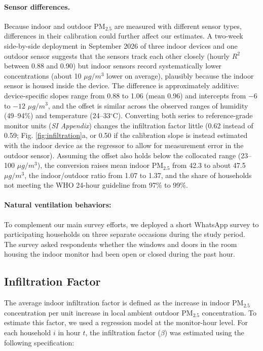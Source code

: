\documentclass[9pt,twocolumn,twoside]{pnas-new}
\begin{document}
\paragraph{Sensor differences.}
Because indoor and outdoor PM$_{2.5}$ are measured with different sensor types, differences in their calibration could further affect our estimates. A two-week side-by-side deployment in September 2026 of three indoor devices and one outdoor sensor suggests that the sensors track each other closely (hourly $R^2$ between 0.88 and 0.90) but indoor sensors record systematically lower concentrations (about 10 $\mu g/m^3$ lower on average), plausibly because the indoor sensor is housed inside the device. 
The difference is approximately additive: device-specific slopes range from 0.88 to 1.06 (mean 0.96) and intercepts from $-6$ to $-12$ $\mu g/m^3$, and the offset is similar across the observed ranges of humidity (49--94\%) and temperature (24--33$^{\circ}$C). Converting both series to reference-grade monitor units (\textit{SI Appendix}) changes the infiltration factor little (0.62 instead of 0.59; Fig. \ref{fig:infiltration}a, or 0.50 if the calibration slope is instead estimated with the indoor device as the regressor to allow for measurement error in the outdoor sensor). Assuming the offset also holds below the collocated range (23--100 $\mu g/m^3$), the conversion raises mean indoor PM$_{2.5}$ from 42.3 to about 47.5 $\mu g/m^3$, the indoor/outdoor ratio from 1.07 to 1.37, and the share of households not meeting the WHO 24-hour guideline from 97\% to 99\%.

\paragraph{Natural ventilation behaviors:} To complement our main survey efforts, we deployed a short WhatsApp survey to participating households on three separate occasions during the study period. The survey asked respondents whether the windows and doors in the room housing the indoor monitor had been open or closed during the past hour.


\subsection{Infiltration Factor}
The average indoor infiltration factor is defined as the increase in indoor PM$_{2.5}$ concentration per unit increase in local ambient outdoor PM$_{2.5}$ concentration. To estimate this factor, we used a regression model at the monitor-hour level. For each household $i$ in hour $t$, the infiltration factor ($\beta$) was estimated using the following specification:

\end{document}
